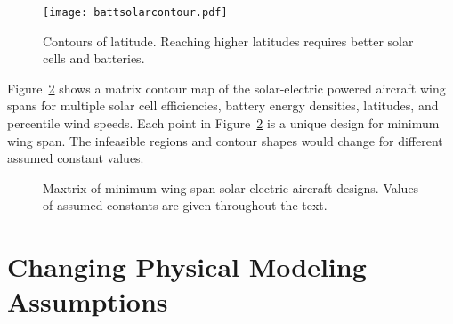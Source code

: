 \begin{figure}[h!]
	\begin{center}
	\texttt{[image: battsolarcontour.pdf]}
    \caption{Contours of latitude. Reaching higher latitudes requires better solar cells and batteries.}
	\label{f:battsolarcontour}
	\end{center}
\end{figure}


Figure~\ref{f:solarcontours} shows a matrix contour map of the solar-electric powered aircraft wing spans for multiple solar cell efficiencies, battery energy densities, latitudes, and percentile wind speeds.
Each point in Figure~\ref{f:solarcontours} is a unique design for minimum wing span. 
The infeasible regions and contour shapes would change for different assumed constant values. 

 \begin{figure}[h!]
 \begin{subfigmatrix}{3}%
 \end{subfigmatrix}
 \caption{Maxtrix of minimum wing span solar-electric aircraft designs. Values of assumed constants are given throughout the text.}
 \label{f:solarcontours}
\end{figure}

\section{Changing Physical Modeling Assumptions}

